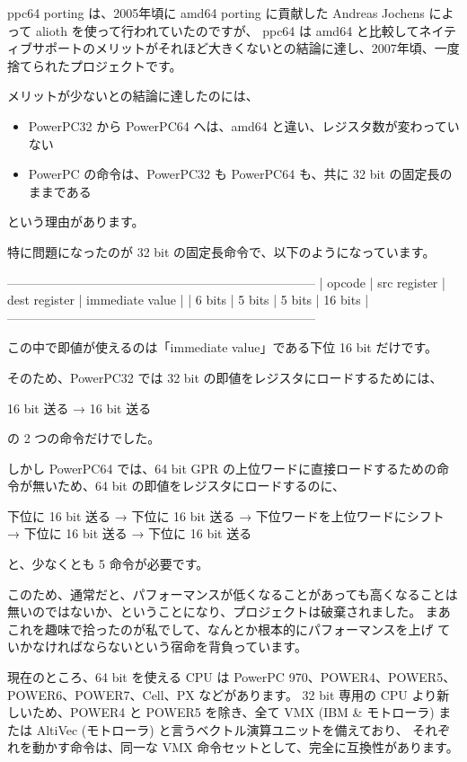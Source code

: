 \documentclass[mingoth,a4paper]{jsarticle}
\begin{document}
ppc64 porting は、2005年頃に amd64 porting に貢献した Andreas Jochens によって alioth を使って行われていたのですが、
ppc64 は amd64 と比較してネイティブサポートのメリットがそれほど大きくないとの結論に達し、2007年頃、一度捨てられたプロジェクトです。

メリットが少ないとの結論に達したのには、
\begin{itemize}
   \item PowerPC32 から PowerPC64 へは、amd64 と違い、レジスタ数が変わっていない
   \item PowerPC の命令は、PowerPC32 も PowerPC64 も、共に 32 bit の固定長のままである
\end{itemize}
という理由があります。

特に問題になったのが 32 bit の固定長命令で、以下のようになっています。
\begin{commandline}
--------------------------------------------------------------------------
|    opcode    | src register | dest register |     immediate value      |
|    6 bits    |   5 bits     |    5 bits     |         16 bits          |
--------------------------------------------------------------------------
\end{commandline}
この中で即値が使えるのは「immediate value」である下位 16 bit だけです。

そのため、PowerPC32 では 32 bit の即値をレジスタにロードするためには、
\begin{commandline}
16 bit 送る → 16 bit 送る
\end{commandline}
の 2 つの命令だけでした。

しかし PowerPC64 では、64 bit GPR の上位ワードに直接ロードするための命令が無いため、64 bit の即値をレジスタにロードするのに、
\begin{commandline}
下位に 16 bit 送る → 下位に 16 bit 送る → 下位ワードを上位ワードにシフト → 下位に 16 bit 送る → 下位に 16 bit 送る
\end{commandline}
と、少なくとも 5 命令が必要です。

このため、通常だと、パフォーマンスが低くなることがあっても高くなることは無いのではないか、ということになり、プロジェクトは破棄されました。
まあこれを趣味で拾ったのが私でして、なんとか根本的にパフォーマンスを上げ
ていかなければならないという宿命を背負っています。

現在のところ、64 bit を使える CPU は PowerPC 970、POWER4、POWER5、POWER6、POWER7、Cell、PX などがあります。
32 bit 専用の CPU より新しいため、POWER4 と POWER5 を除き、全て VMX (IBM \& モトローラ) または AltiVec (モトローラ) と言うベクトル演算ユニットを備えており、
それぞれを動かす命令は、同一な VMX 命令セットとして、完全に互換性があります。
\end{document}
